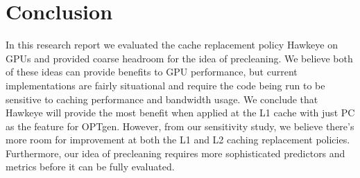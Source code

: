 \chapter{Conclusion}

In this research report we evaluated the cache replacement policy Hawkeye on GPUs and provided coarse headroom for the idea of precleaning. We believe both of these ideas can provide benefits to GPU performance, but current implementations are fairly situational and require the code being run to be sensitive to caching performance and bandwidth usage. We conclude that Hawkeye will provide the most benefit when applied at the L1 cache with just PC as the feature for OPTgen. However, from our sensitivity study, we believe there's more room for improvement at both the L1 and L2 caching replacement policies. Furthermore, our idea of precleaning requires more sophisticated predictors and metrics before it can be fully evaluated.
